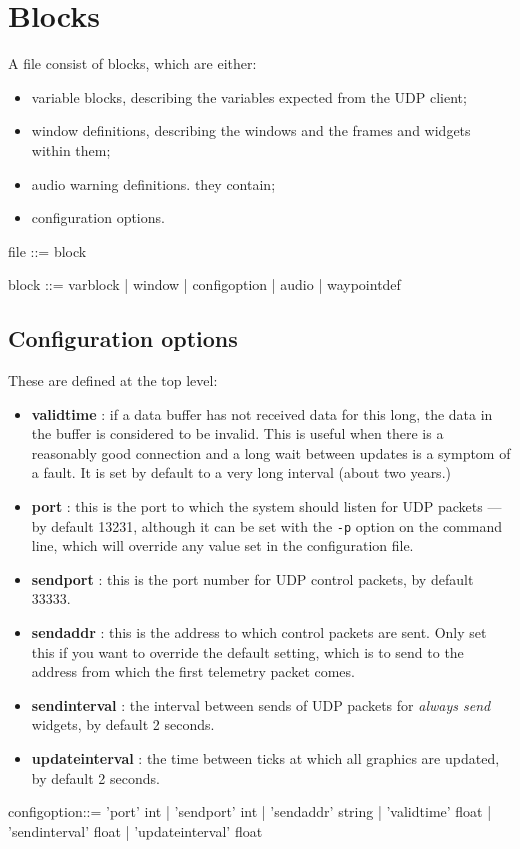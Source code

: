 \section{Blocks}
A file consist of blocks, which are either:
\begin{itemize}
\item variable blocks, describing the variables expected from the UDP client;
\item window definitions, describing the windows and the frames and widgets within them;
\item audio warning definitions.
they contain;
\item configuration options.
\end{itemize}

\begin{v}
file        ::= { block }

block       ::= varblock
            |   window
            |   configoption
            |   audio
            |   waypointdef
\end{v}

\subsection{Configuration options}
These are defined at the top level:
\begin{itemize}
\item \textbf{validtime} : if a data buffer has not received data for this long, the data in the buffer is 
considered to be invalid. This is useful when there is a reasonably good connection and a long wait between updates
is a symptom of a fault. It is set by default to a very long interval (about two years.)
\item \textbf{port} : this is the port to which the system should listen for UDP packets --- by default 13231, although
it can be set with the \verb+-p+ option on the command line, which will override any value set in the configuration file.
\item \textbf{sendport} : this is the port number for UDP control packets, by default 33333. 
\item \textbf{sendaddr} : this is the address to which control packets are sent. Only set this if you want to override the default
setting, which is to send to the address from which the first telemetry packet comes.
\item \textbf{sendinterval} : the interval between sends of UDP packets for \emph{always send} widgets, by default 2 seconds.
\item \textbf{updateinterval} : the time between ticks at which all graphics are updated, by default 2 seconds.
\end{itemize}
\begin{v}
configoption::= 'port' int
            |   'sendport' int
            |   'sendaddr' string
            |   'validtime' float
            |   'sendinterval' float
            |   'updateinterval' float
\end{v}

